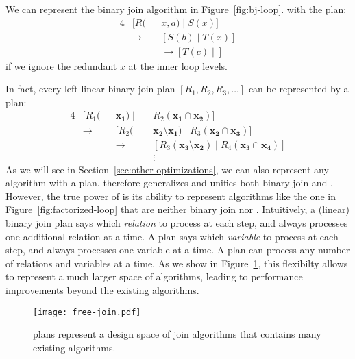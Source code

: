 %
\begin{example}
  We can represent the binary join algorithm in Figure~\ref{fig:bj-loop}.
  with the \FJ plan:
  \begin{alignat*}{4}
     & [R(         &  & x, a) \mid S(x)]        \\
     & \rightarrow &  & [S(b) \mid T(x)]        \\
     &             &  & \rightarrow [T(c) \mid]
  \end{alignat*}
  if we ignore the redundant $x$ at the inner loop levels.
\end{example}
%
In fact, every left-linear binary join plan $[R_1, R_2, R_3, \ldots]$
can be represented by a \FJ plan:
\begin{alignat*}{4}
   & [R_1(       &  & \mathbf{x_1}) \mid &  & R_2(\mathbf{\mathbf{x_1} \cap \mathbf{x_2}})]                                      \\
   & \rightarrow &  & [R_2(              &  & \mathbf{x_2} \setminus \mathbf{x_1}) \mid R_3(\mathbf{x_2}\cap \mathbf{x_3})]      \\
   &             &  & \rightarrow        &  & [R_3(\mathbf{x_3} \setminus \mathbf{x_2}) \mid R_4(\mathbf{x_3}\cap \mathbf{x_4})] \\
   &             &  &                    &  & \vdots
\end{alignat*}
%
As we will see in Section~\ref{sec:other-optimizations},
we can also represent any \GJ algorithm with a \FJ plan.
\FJ therefore generalizes and unifies both binary join and \GJ.
However, the true power of \FJ is its ability to represent
algorithms like the one in Figure~\ref{fig:factorized-loop}
that are neither binary join nor \GJ.
Intuitively, a (linear) binary join plan says which {\em relation}
to process at each step,
and always processes one additional relation at a time.
A \GJ plan says which {\em variable} to process at each step,
and always processes one variable at a time.
A \FJ plan can process any number of relations and variables at a time.
As we show in Figure~\ref{fig:free-join-space}, this flexibilty allows \FJ
to represent a much larger space of algorithms,
leading to performance improvements beyond the existing algorithms.

\begin{figure}
  \texttt{[image: free-join.pdf]}
  \caption{\FJ plans represent a design space of join algorithms
    that contains many existing algorithms.}
  \label{fig:free-join-space}
\end{figure}

